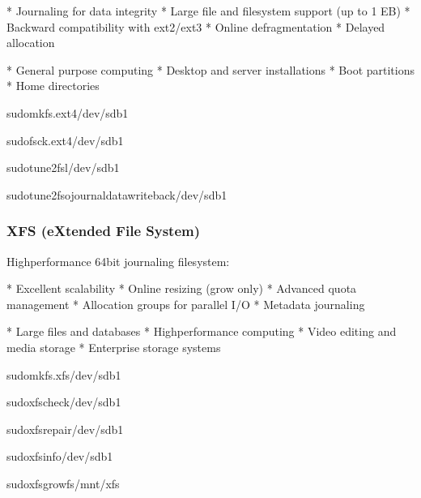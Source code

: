 \documentclass[letterpaper,10pt,english]{sphinxmanual}
\begin{document}
\sphinxAtStartPar
{}
* Journaling for data integrity
* Large file and filesystem support (up to 1 EB)
* Backward compatibility with ext2/ext3
* Online defragmentation
* Delayed allocation

\sphinxAtStartPar
{}
* General purpose computing
* Desktop and server installations
* Boot partitions
* Home directories

\begin{sphinxVerbatim}[commandchars=\\\{\}]
sudomkfs.ext4/dev/sdb1

sudofsck.ext4/dev/sdb1

sudotune2fs\PYGZhy{}l/dev/sdb1

sudotune2fs\PYGZhy{}ojournal\PYGZus{}data\PYGZus{}writeback/dev/sdb1
\end{sphinxVerbatim}


\subsubsection{XFS (eXtended File System)}
\label{\detokenize{file-systems:xfs-extended-file-system}}
\sphinxAtStartPar
High\sphinxhyphen{}performance 64\sphinxhyphen{}bit journaling filesystem:

\sphinxAtStartPar
{}
* Excellent scalability
* Online resizing (grow only)
* Advanced quota management
* Allocation groups for parallel I/O
* Metadata journaling

\sphinxAtStartPar
{}
* Large files and databases
* High\sphinxhyphen{}performance computing
* Video editing and media storage
* Enterprise storage systems

\begin{sphinxVerbatim}[commandchars=\\\{\}]
sudomkfs.xfs/dev/sdb1

sudoxfs\PYGZus{}check/dev/sdb1

sudoxfs\PYGZus{}repair/dev/sdb1

sudoxfs\PYGZus{}info/dev/sdb1

sudoxfs\PYGZus{}growfs/mnt/xfs
\end{sphinxVerbatim}
\end{document}
